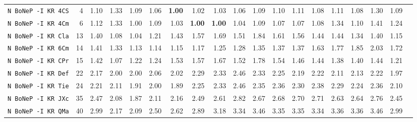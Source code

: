 \begin{tabular}{l | r @{~~} r | r@{~~}r@{~~}r@{~~}r@{~~}r@{~~}r@{~~}r@{~~}r@{~~}r@{~~}r@{~~}r@{~~}r@{~~}r@{~~}r@{~~}r@{~~}r|}
\verb+N BoNeP -I KR 4CS+ & 4 & 1.10 & 1.33&1.09&1.06&\textbf{1.00}&1.02&1.03&1.06&1.09&1.10&1.11&1.08&1.11&1.08&1.30&1.09\\
\verb+N BoNeP -I KR 4Cm+ & 6 & 1.12 & 1.33&1.00&1.09&1.03&\textbf{1.00}&\textbf{1.00}&1.04&1.09&1.07&1.07&1.08&1.34&1.10&1.41&1.24\\
\verb+N BoNeP -I KR Cla+ & 13 & 1.40 & 1.08&1.04&1.21&1.43&1.57&1.69&1.51&1.84&1.61&1.56&1.44&1.44&1.34&1.40&1.15\\
\verb+N BoNeP -I KR 6Cm+ & 14 & 1.41 & 1.33&1.13&1.14&1.15&1.17&1.25&1.28&1.35&1.37&1.37&1.63&1.77&1.85&2.03&1.72\\
\verb+N BoNeP -I KR CPr+ & 15 & 1.42 & 1.07&1.22&1.24&1.53&1.57&1.67&1.52&1.78&1.54&1.46&1.44&1.38&1.40&1.44&1.21\\
\verb+N BoNeP -I KR Def+ & 22 & 2.17 & 2.00&2.00&2.06&2.02&2.29&2.33&2.46&2.33&2.25&2.19&2.22&2.11&2.13&2.22&1.97\\
\verb+N BoNeP -I KR Tie+ & 24 & 2.21 & 2.11&1.91&2.00&1.89&2.25&2.33&2.46&2.35&2.36&2.30&2.38&2.29&2.24&2.36&2.10\\
\verb+N BoNeP -I KR JXc+ & 35 & 2.47 & 2.08&1.87&2.11&2.16&2.49&2.61&2.82&2.67&2.68&2.70&2.71&2.63&2.64&2.76&2.45\\
\verb+N BoNeP -I KR QMa+ & 40 & 2.99 & 2.17&2.09&2.50&2.62&2.89&3.18&3.34&3.46&3.35&3.35&3.34&3.36&3.36&3.46&2.99\\
\end{tabular}
